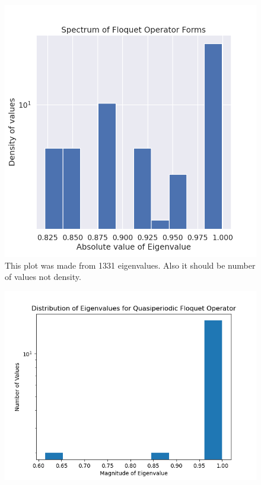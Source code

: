 \documentclass[12pt]{article}
\begin{document}
\begin{figure}[h]
\includegraphics[width=\linewidth]{floquet_spectrum_21}
\centering
\caption{This plot was made from 1331 eigenvalues. Also it should be
number of values not density.}
\end{figure}

\begin{figure}[h]
\includegraphics[width=\linewidth]{quasiperiodic_floquet_eigenval_dist_10}
\centering
\end{figure}
\end{document}
